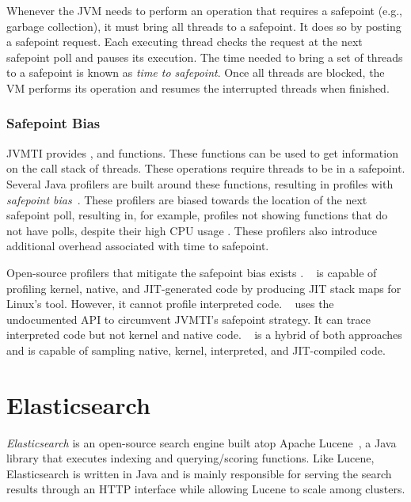 Whenever the JVM needs to perform an operation that requires a safepoint (e.g., garbage collection), it must bring all threads to a safepoint. It does so by posting a safepoint request. Each executing thread checks the request at the next safepoint poll and pauses its execution. The time needed to bring a set of threads to a safepoint is known as \emph{time to safepoint}. Once all threads are blocked, the VM performs its operation and resumes the interrupted threads when finished.

\subsubsection*{Safepoint Bias}

JVMTI provides ,  and  functions. These functions can be used to get information on the call stack of threads. These operations require threads to be in a safepoint. Several Java profilers are built around these functions, resulting in profiles with \emph{safepoint bias}~\cite{mytkowicz2010evaluating}. These profilers are biased towards the location of the next safepoint poll, resulting in, for example, profiles not showing functions that do not have polls, despite their high CPU usage \cite{wakart2016terrible}. These profilers also introduce additional overhead associated with time to safepoint.

Open-source profilers that mitigate the safepoint bias exists \cite{nisbet2019profiling}. ~\cite{perfmapagent} is capable of profiling kernel, native, and JIT-generated code by producing JIT stack maps for Linux's  tool. However, it cannot profile interpreted code. ~\cite{honestprofiler} uses the  undocumented API to circumvent JVMTI's safepoint strategy. It can trace interpreted code but not kernel and native code. ~\cite{asyncprofiler} is a hybrid of both approaches and is capable of sampling native, kernel, interpreted, and JIT-compiled code.

\section{Elasticsearch}

\emph{Elasticsearch} is an open-source search engine built atop Apache Lucene~\cite{bialecki2012lucene}, a Java library that executes indexing and querying/scoring functions. Like Lucene, Elasticsearch is written in Java and is mainly responsible for serving the search results through an HTTP interface while allowing Lucene to scale among clusters.

